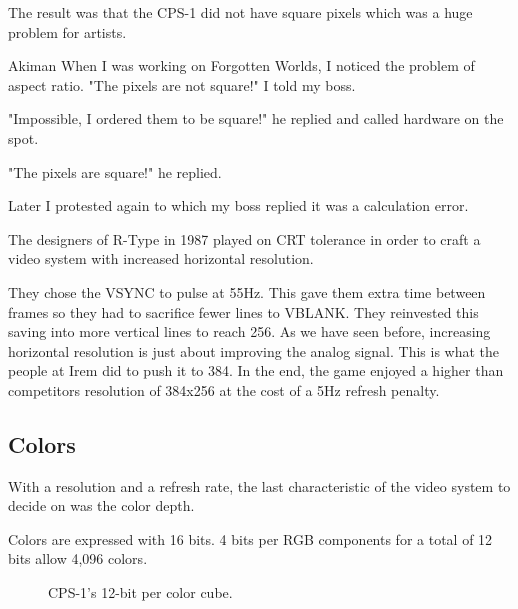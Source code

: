 
The result was that the CPS-1 did not have square pixels which was a huge problem for artists.  

\begin{q}{Akiman\cite{akiman}}
When I was working on Forgotten Worlds, I noticed the problem of aspect ratio. "The pixels are not square!" I told my boss.

"Impossible, I ordered them to be square!" he replied and called hardware on the spot.

"The pixels are square!" he replied. 

Later I protested again to which my boss replied it was a calculation error.
\end{q}


\begin{trivia}
The designers of R-Type in 1987 played on CRT tolerance in order to craft a video system with increased horizontal resolution. 

They chose the VSYNC to pulse at 55Hz. This gave them extra time between frames so they had to sacrifice fewer lines to VBLANK. They reinvested this saving into more vertical lines to reach 256. As we have seen before, increasing horizontal resolution is just about improving the analog signal. This is what the people at Irem did to push it to 384. In the end, the game enjoyed a higher than competitors resolution of 384x256 at the cost of a 5Hz refresh penalty.
\end{trivia}



\subsection{Colors}
With a resolution and a refresh rate, the last characteristic of the video system to decide on was the color depth. 

Colors are expressed with 16 bits. 4 bits per RGB components for a total of 12 bits allow 4,096 colors. 


\begin{figure}[H]
\begin{minipage}[t]{0.49\linewidth}
\end{minipage}%
\hfill%
\begin{minipage}[t]{0.49\linewidth}
\end{minipage}
\caption*{CPS-1's 12-bit per color cube.}
\end{figure}
  
